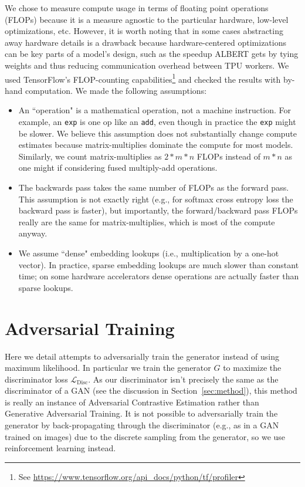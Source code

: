 \documentclass{article}
\newcommand{\lossds}{\mathcal{L}_\text{Disc}}
\begin{document}
We chose to measure compute usage in terms of floating point operations (FLOPs) because it is a measure agnostic to the particular hardware, low-level optimizations, etc. 
However, it is worth noting that in some cases abstracting away hardware details is a drawback because hardware-centered optimizations can be key parts of a model's design, such as the speedup ALBERT \citep{lan2019albert} gets by tying weights and thus reducing communication overhead between TPU workers. 
We used TensorFlow's FLOP-counting capabilities\footnote{See \url{https://www.tensorflow.org/api_docs/python/tf/profiler}} and checked the results with by-hand computation. We made the following assumptions: 
\begin{itemize}
    \item An ``operation" is a mathematical operation, not a machine instruction. For example, an \texttt{exp} is one op like an \texttt{add}, even though in practice the \texttt{exp} might be slower. We believe this assumption does not substantially change compute estimates because matrix-multiplies dominate the compute for most models. Similarly, we count matrix-multiplies as $2*m*n$ FLOPs instead of $m*n$ as one might if considering fused multiply-add operations. 
    \item The backwards pass takes the same number of FLOPs as the forward pass. This assumption is not exactly right (e.g., for softmax cross entropy loss the backward pass is faster), but importantly, the forward/backward pass FLOPs really are the same for matrix-multiplies, which is most of the compute anyway.
    \item We assume ``dense" embedding lookups (i.e., multiplication by a one-hot vector). In practice, sparse embedding lookups are much slower than constant time; on some hardware accelerators dense operations are actually faster than sparse lookups.
\end{itemize}


\section{Adversarial Training}
\label{app:adv}
Here we detail attempts to adversarially train the generator instead of using maximum likelihood.
In particular we train the generator $G$ to maximize the discriminator loss $\lossds$.
As our discriminator isn't precisely the same as the discriminator of a GAN (see the discussion in Section~\ref{sec:method}), this method is really an instance of Adversarial Contrastive Estimation \citep{Bose2018AdversarialCE} rather than Generative Adversarial Training.
It is not possible to adversarially train the generator by back-propagating through the discriminator (e.g., as in a GAN trained on images) due to the discrete sampling from the generator, so we use reinforcement learning instead. 
\end{document}
